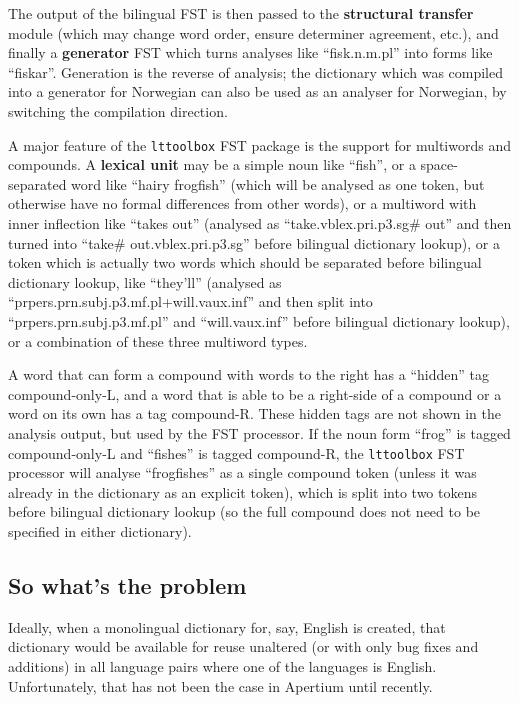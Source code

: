 \documentclass[10pt, a4paper]{article}
\begin{document}
The output of the bilingual FST is then passed to the
\textbf{structural transfer} module (which may change word order,
ensure determiner agreement, etc.), and finally a \textbf{generator}
FST which turns analyses like ``fisk.n.m.pl'' into forms like
``fiskar''. Generation is the reverse of analysis; the dictionary
which was compiled into a generator for Norwegian can also be used as
an analyser for Norwegian, by switching the compilation direction.

A major feature of the \texttt{lttoolbox} FST package is the support
for multiwords and compounds. A \textbf{lexical unit} may be a simple
noun like ``fish'', or a space-separated word like ``hairy frogfish''
(which will be analysed as one token, but otherwise have no formal
differences from other words), or a multiword with inner inflection
like ``takes out'' (analysed as ``take.vblex.pri.p3.sg\# out'' and
then turned into ``take\# out.vblex.pri.p3.sg'' before bilingual
dictionary lookup), or a token which is actually two words which
should be separated before bilingual dictionary lookup, like
``they'll'' (analysed as ``prpers.prn.subj.p3.mf.pl+will.vaux.inf''
and then split into ``prpers.prn.subj.p3.mf.pl'' and ``will.vaux.inf''
before bilingual dictionary lookup), or a combination of these three
multiword types. 

A word that can form a compound with words to the right has a
``hidden'' tag compound-only-L, and a word that is able to be a
right-side of a compound or a word on its own has a tag compound-R.
These hidden tags are not shown in the analysis output, but used by
the FST processor. If the noun form ``frog'' is tagged compound-only-L
and ``fishes'' is tagged compound-R, the \texttt{lttoolbox} FST
processor will analyse ``frogfishes'' as a single compound token
(unless it was already in the dictionary as an explicit token), which
is split into two tokens before bilingual dictionary lookup (so the
full compound does not need to be specified in either dictionary).

\subsection{So what's the problem}

Ideally, when a monolingual dictionary for, say, English is created,
that dictionary would be available for reuse unaltered (or with only
bug fixes and additions) in all language pairs where one of the
languages is English. Unfortunately, that has not been the case in
Apertium until recently.
\end{document}
